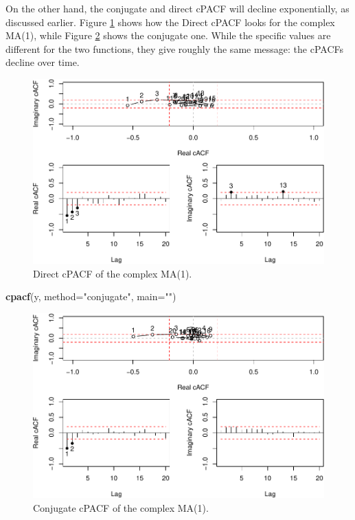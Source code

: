 \documentclass[
]{book}
\newenvironment{Shaded}{\begin{snugshade}}{\end{snugshade}}
\newcommand{\DataTypeTok}[1]{\textcolor[rgb]{0.13,0.29,0.53}{#1}}
\newcommand{\KeywordTok}[1]{\textcolor[rgb]{0.13,0.29,0.53}{\textbf{#1}}}
\newcommand{\NormalTok}[1]{#1}
\newcommand{\StringTok}[1]{\textcolor[rgb]{0.31,0.60,0.02}{#1}}
\begin{document}
On the other hand, the conjugate and direct cPACF will decline exponentially, as discussed earlier. Figure \ref{fig:complexMA1cpACFDir} shows how the Direct cPACF looks for the complex MA(1), while Figure \ref{fig:complexMA1cPACF} shows the conjugate one. While the specific values are different for the two functions, they give roughly the same message: the cPACFs decline over time.

\begin{figure}
\centering
\includegraphics{Svetunkov---Svetunkov---Complex-Valued-Econometrics_files/figure-latex/complexMA1cpACFDir-1.pdf}
\caption{\label{fig:complexMA1cpACFDir}Direct cPACF of the complex MA(1).}
\end{figure}

\begin{Shaded}
\begin{Highlighting}[]
\KeywordTok{cpacf}\NormalTok{(y, }\DataTypeTok{method=}\StringTok{"conjugate"}\NormalTok{, }\DataTypeTok{main=}\StringTok{""}\NormalTok{)}
\end{Highlighting}
\end{Shaded}

\begin{figure}
\centering
\includegraphics{Svetunkov---Svetunkov---Complex-Valued-Econometrics_files/figure-latex/complexMA1cPACF-1.pdf}
\caption{\label{fig:complexMA1cPACF}Conjugate cPACF of the complex MA(1).}
\end{figure}
\end{document}
